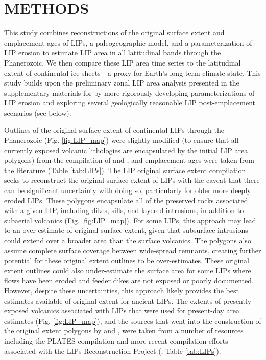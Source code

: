 \documentclass[11pt,letterpaper]{article}
\begin{document}
\section*{METHODS}

This study combines reconstructions of the original surface extent and emplacement ages of LIPs, a paleogeographic model, and a parameterization of LIP erosion to estimate LIP area in all latitudinal bands through the Phanerozoic. We then compare these LIP area time series to the latitudinal extent of continental ice sheets - a proxy for Earth's long term climate state. This study builds upon the preliminary zonal LIP area analysis presented in the supplementary materials for \citet{Macdonald2019a} by more rigorously developing parameterizations of LIP erosion and exploring several geologically reasonable LIP post-emplacement scenarios (see below).

Outlines of the original surface extent of continental LIPs through the Phanerozoic (Fig. \ref{fig:LIP_map}) were slightly modified (to ensure that all currently exposed volcanic lithologies are encapsulated by the initial LIP area polygons) from the compilation of \citet{Ernst2017a} and \citet{Ernst2019a}, and emplacement ages were taken from the literature (Table \ref{tab:LIPs}). The LIP original surface extent compilation seeks to reconstruct the original surface extent of LIPs with the caveat that there can be significant uncertainty with doing so, particularly for older more deeply eroded LIPs. These polygons encapsulate all of the preserved rocks associated with a given LIP, including dikes, sills, and layered intrusions, in addition to subaerial volcanics (Fig. \ref{fig:LIP_map}). For some LIPs, this approach may lead to an over-estimate of original surface extent, given that subsurface intrusions could extend over a broader area than the surface volcanics. The polygons also assume complete surface coverage between wide-spread remnants, creating further potential for these original extent outlines to be over-estimates. These original extent outlines could also under-estimate the surface area for some LIPs where flows have been eroded and feeder dikes are not exposed or poorly documented. However, despite these uncertainties, this approach likely provides the best estimates available of original extent for ancient LIPs. The extents of presently-exposed volcanics associated with LIPs that were used for present-day area estimates (Fig. \ref{fig:LIP_map}), and the sources that went into the construction of the original extent polygons by \citet{Ernst2017a} and \citet{Ernst2019a}, were taken from a number of resources including the PLATES compilation \citep{Coffin2006a} and more recent compilation efforts associated with the LIPs Reconstruction Project (\citealp{Ernst2013a}; Table \ref{tab:LIPs}).
\end{document}
